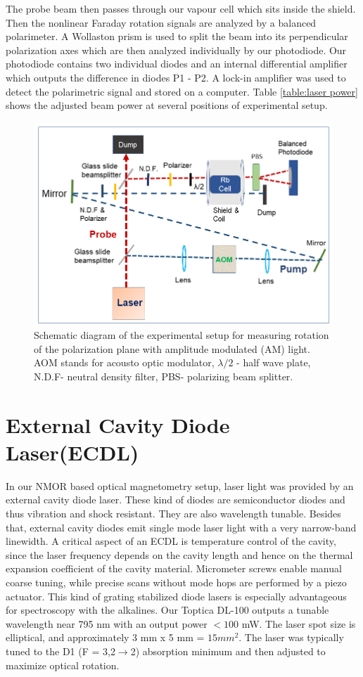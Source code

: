 The probe beam then passes through our vapour cell which sits inside the shield. Then the nonlinear Faraday rotation signals are analyzed by a balanced polarimeter.  A Wollaston prism is used to
split the beam into its perpendicular polarization axes which are then
analyzed individually by our photodiode. Our photodiode contains two
individual diodes and an internal differential amplifier which outputs the difference in diodes P1 - P2. A lock-in amplifier was used to detect the polarimetric signal and stored on a computer. Table \ref{table:laser power} shows the adjusted beam power at several positions of experimental setup.
\begin{figure}%
\centering
\includegraphics[width=0.95\linewidth]{figures/experimental_setup}
\caption{Schematic diagram of the experimental setup for measuring
  rotation of the polarization plane with amplitude modulated (AM)
  light. AOM stands for acousto optic modulator, $\lambda/2$ - half
  wave plate, N.D.F- neutral density filter, PBS- polarizing beam
  splitter.\label{fig:pumpprobe}}
\end{figure}
\section{External Cavity Diode Laser(ECDL)}
\bigskip
In our NMOR based optical magnetometry setup, laser light was provided by an external cavity diode laser. These kind of diodes are semiconductor diodes and thus vibration and shock resistant. They are also wavelength tunable. Besides that, external cavity diodes emit single mode laser light with a very narrow-band linewidth. A critical aspect of an ECDL is temperature control of the cavity, since the laser frequency depends on the cavity length and hence on the thermal expansion coefficient of the cavity material. Micrometer screws enable manual coarse tuning, while precise scans without mode hops are performed by a piezo actuator. This kind of grating stabilized diode lasers is especially advantageous for spectroscopy with the alkalines. Our Toptica DL-100 outputs a tunable wavelength near 795 nm with an output power $<100$ mW. The laser spot size is elliptical, and approximately 3 mm x 5 mm = $15 mm^2$.  The laser was typically tuned to the D1 (F = 3,2$\rightarrow$2) absorption minimum and then adjusted to maximize optical rotation. 

